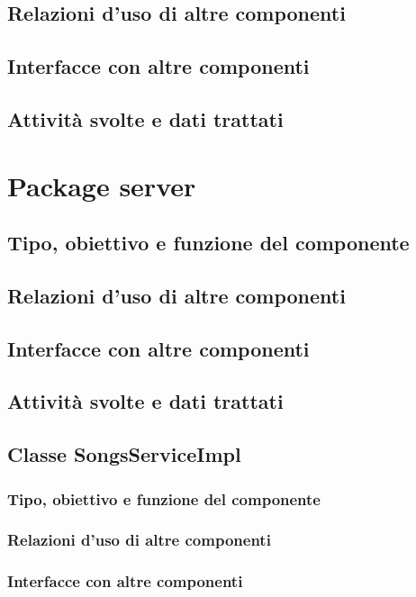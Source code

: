 \subsection*{Relazioni d'uso di altre componenti}
\subsection*{Interfacce con altre componenti}
\subsection*{Attivit\`a svolte e dati trattati}
\newpage
\section{Package server} %
\subsection*{Tipo, obiettivo e funzione del componente}
\subsection*{Relazioni d'uso di altre componenti}
\subsection*{Interfacce con altre componenti}
\subsection*{Attivit\`a svolte e dati trattati}

\subsection{Classe SongsServiceImpl}
\subsubsection*{Tipo, obiettivo e funzione del componente}
\subsubsection*{Relazioni d'uso di altre componenti}
\subsubsection*{Interfacce con altre componenti}
